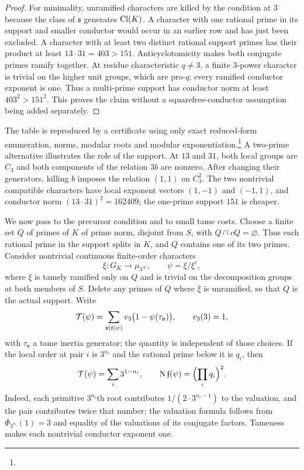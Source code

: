 \begin{proof}
For minimality, unramified characters are killed by the condition at $3$
because the class of $\mathfrak s$ generates $\operatorname{Cl}(K)$. A character with one
rational prime in its support and smaller conductor would occur in an earlier
row and has just been excluded. A character with at least two distinct
rational support primes has their product at least $13\cdot31=403>151$.
Anticyclotomicity makes both conjugate primes ramify together. At residue
characteristic $q\ne3$, a finite $3$-power character is trivial on the higher
unit groups, which are pro-$q$; every ramified conductor exponent is one.
Thus a multi-prime support has conductor norm at least $403^2>151^2$. This
proves the claim without a squarefree-conductor assumption being added
separately.
\end{proof}

The table is reproduced by a certificate using only exact reduced-form
enumeration, norms, modular roots and modular
exponentiation.\footnote{}
A two-prime alternative illustrates the role of the support. At $13$ and
$31$, both local groups are $C_3$ and both components of the relation $3b$
are nonzero. After changing their generators, killing $b$ imposes the
relation $(1,1)$ on $C_3^2$. The two nontrivial compatible characters have
local exponent vectors $(1,-1)$ and $(-1,1)$, and conductor norm
$(13\cdot31)^2=162409$; the one-prime support $151$ is cheaper.

\medskip
We now pass to the precursor condition and to small tame costs. Choose a
finite set $Q$ of primes of $K$ of prime norm, disjoint from $S$, with
$Q\cap cQ=\varnothing$. Thus each rational prime in the support splits in
$K$, and $Q$ contains one of its two primes. Consider nontrivial continuous
finite-order characters
\[
 \xi\colon G_K\longrightarrow\mu_{3^\infty},\qquad\psi=\xi/\xi^c,
\]
where $\xi$ is tamely ramified only on $Q$ and is trivial on the
decomposition groups at both members of $S$. Delete any primes of $Q$ where
$\xi$ is unramified, so that $Q$ is the actual support. Write
\begin{equation}\label{spn:eq:tame-cost-def}
 \mathcal{T}(\psi)=\sum_{\mathfrak v\mid\mathfrak f(\psi)}
 v_3\bigl(1-\psi(\tau_{\mathfrak v})\bigr),\qquad v_3(3)=1,
\end{equation}
with $\tau_{\mathfrak v}$ a tame inertia generator; the quantity is
independent of those choices. If the local order at pair $i$ is $3^{n_i}$ and
the rational prime below it is $q_i$, then
\begin{equation}\label{spn:eq:source-twist-cost}
 \mathcal{T}(\psi)=\sum_i3^{1-n_i},\qquad
 \operatorname{N}\mathfrak f(\psi)=\Bigl(\prod_iq_i\Bigr)^2 .
\end{equation}
Indeed, each primitive $3^{n_i}$th root contributes $1/(2\cdot3^{n_i-1})$ to
the valuation, and the pair contributes twice that number; the valuation
formula follows from $\Phi_{3^{n_i}}(1)=3$ and equality of the valuations of
its conjugate factors. Tameness makes each nontrivial conductor exponent
one.

